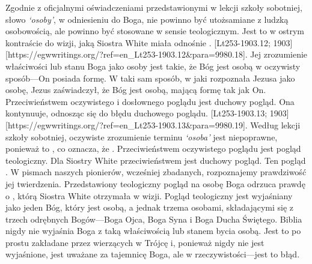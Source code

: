 Zgodnie z oficjalnymi oświadczeniami przedstawionymi w lekcji szkoły sobotniej, słowo \textit{‘osoby’},\textit{ }w odniesieniu do Boga, nie powinno być utożsamiane z ludzką osobowością, ale powinno być stosowane w sensie teologicznym. Jest to w ostrym kontraście do wizji, jaką Siostra White miała odnośnie . [Lt253-1903.12; 1903][https://egwwritings.org/?ref=en\_Lt253-1903.12&para=9980.18]. Jej zrozumienie właściwości lub stanu Boga jako osoby jest takie, że Bóg jest osobą w oczywisty sposób—On posiada formę. W taki sam sposób, w jaki rozpoznała Jezusa jako osobę, Jezus zaświadczył, że Bóg jest osobą, mającą formę tak jak On. Przeciwieństwem oczywistego i dosłownego poglądu jest duchowy pogląd. Ona kontynuuje, odnosząc się do błędu duchowego poglądu. [Lt253-1903.13; 1903][https://egwwritings.org/?ref=en\_Lt253-1903.13&para=9980.19]. Według lekcji szkoły sobotniej, oczywiste zrozumienie terminu \textit{‘osoba’ }jest niepoprawne, ponieważ to , co oznacza, że . Przeciwieństwem oczywistego poglądu jest pogląd teologiczny. Dla Siostry White przeciwieństwem jest duchowy pogląd. Ten pogląd . W pismach naszych pionierów, wcześniej zbadanych, rozpoznajemy prawdziwość jej twierdzenia. Przedstawiony teologiczny pogląd na osobę Boga odrzuca prawdę o , którą Siostra White otrzymała w wizji. Pogląd teologiczny jest wyjaśniany jako jeden Bóg, który jest osobą, a jednak trzema osobami, składającymi się z trzech odrębnych Bogów—Boga Ojca, Boga Syna i Boga Ducha Świętego. Biblia nigdy nie wyjaśnia Boga z taką właściwością lub stanem bycia osobą. Jest to po prostu zakładane przez wierzących w Trójcę i, ponieważ nigdy nie jest wyjaśnione, jest uważane za tajemnicę Boga, ale w rzeczywistości—jest to błąd.

